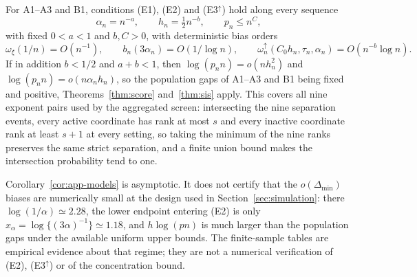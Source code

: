 \begin{corollary}\label{cor:app-models}
For A1--A3 and B1, conditions (E1), (E2) and (E3$^\uparrow$) hold along
every sequence
\[
 \alpha_n=n^{-a},\qquad h_n=\tfrac12n^{-b},\qquad p_n\le n^{C},
\]
with fixed $0<a<1$ and $b,C>0$, with deterministic bias orders
\[
 \omega_\xi(1/n)=O(n^{-1}),
 \qquad
 b_n(3\alpha_n)=O(1/\log n),
 \qquad
 \omega_n^{\uparrow}(C_0h_n,\tau_n,\alpha_n)=O(n^{-b}\log n).
\]
If in addition $b<1/2$ and $a+b<1$, then
$\log(p_nn)=o(nh_n^2)$ and $\log(p_nn)=o(n\alpha_nh_n)$, so the
population gaps of A1--A3 and B1 being fixed and positive,
Theorems~\ref{thm:score} and~\ref{thm:sis} apply. This covers all nine
exponent pairs used by the aggregated screen: intersecting the nine
separation events, every active coordinate has rank at most $s$ and
every inactive coordinate rank at least $s+1$ at every setting, so
taking the minimum of the nine ranks preserves the same strict
separation, and a finite union bound makes the intersection probability
tend to one.
\end{corollary}

\begin{remark}\label{rem:app-finite}
Corollary~\ref{cor:app-models} is asymptotic. It does not certify that
the $o(\Delta_{\min})$ biases are numerically small at the design used
in Section~\ref{sec:simulation}: there $\log(1/\alpha)\simeq2.28$, the
lower endpoint entering (E2) is only
$x_\alpha=\log\{(3\alpha)^{-1}\}\simeq1.18$, and $h\log(pn)$ is much
larger than the population gaps under the available uniform upper
bounds. The finite-sample tables are empirical evidence about that
regime; they are not a numerical verification of (E2), (E3$^\uparrow$)
or of the concentration bound.
\end{remark}
